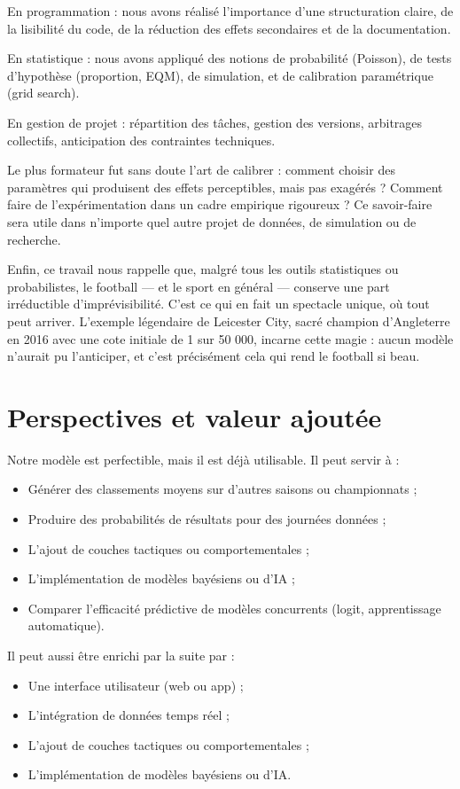 \documentclass[12pt]{report}
\begin{document}
En programmation : nous avons réalisé l’importance d’une structuration claire, de la lisibilité du code, de la réduction des effets secondaires et de la documentation.

En statistique : nous avons appliqué des notions de probabilité (Poisson), de tests d’hypothèse (proportion, EQM), de simulation, et de calibration paramétrique (grid search).

En gestion de projet : répartition des tâches, gestion des versions, arbitrages collectifs, anticipation des contraintes techniques.

Le plus formateur fut sans doute l’art de calibrer : comment choisir des paramètres qui produisent des effets perceptibles, mais pas exagérés ? Comment faire de l’expérimentation dans un cadre empirique rigoureux ? Ce savoir-faire sera utile dans n’importe quel autre projet de données, de simulation ou de recherche.

Enfin, ce travail nous rappelle que, malgré tous les outils statistiques ou probabilistes, le football — et le sport en général — conserve une part irréductible d’imprévisibilité. C’est ce qui en fait un spectacle unique, où tout peut arriver. L’exemple légendaire de Leicester City, sacré champion d’Angleterre en 2016 avec une cote initiale de 1 sur 50 000, incarne cette magie : aucun modèle n’aurait pu l’anticiper, et c’est précisément cela qui rend le football si beau.

\section{Perspectives et valeur ajoutée}

Notre modèle est perfectible, mais il est déjà utilisable. Il peut servir à :\\
\begin{itemize}
  \item Générer des classements moyens sur d’autres saisons ou championnats ;
  \item Produire des probabilités de résultats pour des journées données ;
  \item L’ajout de couches tactiques ou comportementales ;
  \item L’implémentation de modèles bayésiens ou d’IA ;
  \item Comparer l’efficacité prédictive de modèles concurrents (logit, apprentissage automatique).\\
\end{itemize}

Il peut aussi être enrichi par la suite par :\\
\begin{itemize}
  \item Une interface utilisateur (web ou app) ;
  \item L’intégration de données temps réel ;
  \item L’ajout de couches tactiques ou comportementales ;
  \item L’implémentation de modèles bayésiens ou d’IA.\\
\end{itemize}
\end{document}
